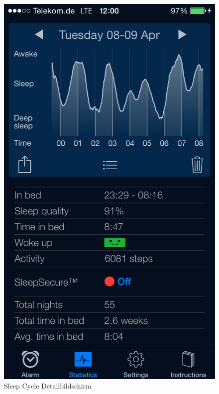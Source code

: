 \begin{figure}[H]
  \centering
  \begin{minipage}[t]{0.47\textwidth}
    \centering
    \includegraphics[scale=0.3]{images/SleepCycle/Detail} 
    \caption{Sleep Cycle Detailbildschirm \cite{fig:SCDetail}}
    \label{fig:SCDetail}
  \end{minipage}
  \begin{minipage}[t]{0.47\textwidth}
    \centering

\end{minipage}
\end{figure}
